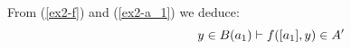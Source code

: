 \noindent
				From (\ref{ex2-f}) and (\ref{ex2-a_1}) we deduce: \begin{equation}
				\hspace{2cm}y \in B(a_1) \vdash f([a_1], y) \in A'\label{ex2-expr1}
				\end{equation}
			